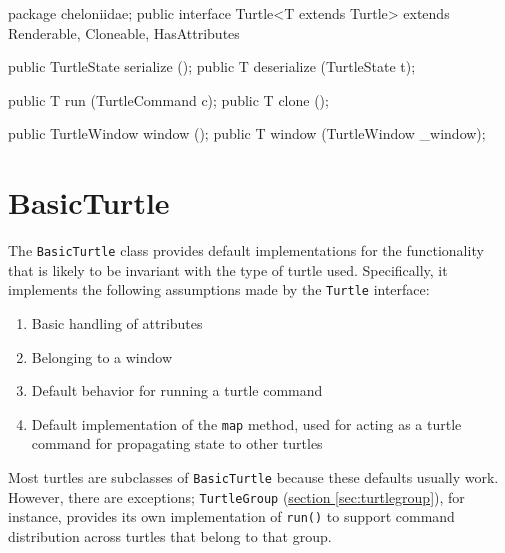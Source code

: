 \documentclass{report}
\newcommand{\Ref}[2]{\hyperref[#2]{#1 \ref*{#2}}}
\begin{document}
\begin{javacode}
package cheloniidae;
public interface Turtle<T extends Turtle>
         extends Renderable, Cloneable, HasAttributes {
  public TurtleState serialize   ();
  public T           deserialize (TurtleState t);

  public T run   (TurtleCommand c);
  public T clone ();

  public TurtleWindow window ();
  public T            window (TurtleWindow _window);
}
\end{javacode}

\section {BasicTurtle} \label{sec:basicturtle}
      The {\tt BasicTurtle} class provides default implementations for the functionality that is likely to be invariant with the type of turtle used.
      Specifically, it implements the following assumptions made by the {\tt Turtle} interface:

\begin{enumerate}
\item Basic handling of attributes
\item Belonging to a window
\item Default behavior for running a turtle command
\item Default implementation of the {\tt map} method, used for acting as a turtle command for propagating state to other turtles
\end{enumerate}

      Most turtles are subclasses of {\tt BasicTurtle} because these defaults usually work. However, there are exceptions; {\tt TurtleGroup}
      (\Ref{section}{sec:turtlegroup}), for instance, provides its own implementation of {\tt run()} to support command distribution across turtles that belong
      to that group.
\end{document}
